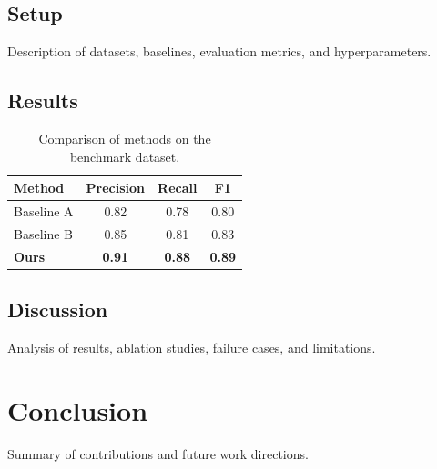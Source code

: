 \documentclass[12pt,a4paper]{article}
\begin{document}
\subsection{Setup}

Description of datasets, baselines, evaluation metrics, and hyperparameters.

\subsection{Results}

\begin{table}[h]
\centering
\begin{tabular}{lccc}
\toprule
\textbf{Method} & \textbf{Precision} & \textbf{Recall} & \textbf{F1} \\
\midrule
Baseline A & 0.82 & 0.78 & 0.80 \\
Baseline B & 0.85 & 0.81 & 0.83 \\
\textbf{Ours} & \textbf{0.91} & \textbf{0.88} & \textbf{0.89} \\
\bottomrule
\end{tabular}
\caption{Comparison of methods on the benchmark dataset.}
\label{tab:results}
\end{table}

\subsection{Discussion}

Analysis of results, ablation studies, failure cases, and limitations.

\section{Conclusion}

Summary of contributions and future work directions.

\end{document}
